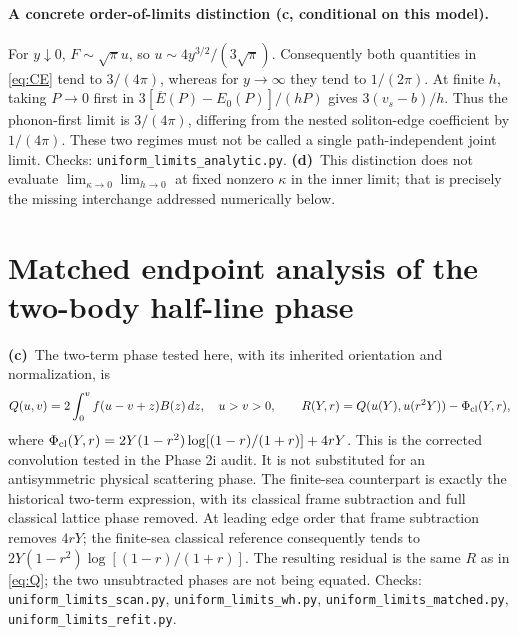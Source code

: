 \documentclass[11pt,a4paper]{article}
\newcommand{\C}{\textbf{(c)}\ }
\newcommand{\D}{\textbf{(d)}\ }
\newcommand{\scr}[1]{\texttt{uniform\_\allowbreak limits\_\allowbreak #1.py}}
\begin{document}
\paragraph{A concrete order-of-limits distinction (c, conditional on this model).}
For $y\downarrow0$, $F\sim\sqrt\pi u$, so $u\sim4y^{3/2}/(3\sqrt\pi)$.
Consequently both quantities in \eqref{eq:CE} tend to $3/(4\pi)$, whereas
for $y\to\infty$ they tend to $1/(2\pi)$. At finite $h$, taking $P\to0$
first in $3[\overline E(P)-E_0(P)]/(hP)$ gives $3(v_s-b)/h$.
Thus the phonon-first limit is $3/(4\pi)$, differing from the nested
soliton-edge coefficient by $1/(4\pi)$. These two regimes must not be
called a single path-independent joint limit. Checks: \scr{analytic}.
\D This distinction does not evaluate $\lim_{\kappa\to0}\lim_{h\to0}$
at fixed nonzero $\kappa$ in the inner limit; that is precisely the missing
interchange addressed numerically below.

\section{Matched endpoint analysis of the two-body half-line phase}
\C The two-term phase tested here, with its inherited orientation and
normalization, is
\begin{equation}
 Q(u,v)=2\int_0^v f(u-v+z)B(z)\,dz,\quad u>v>0,
 \qquad R(Y,r)=Q(u(Y),u(r^2Y))-\Phi_{\rm cl}(Y,r),\label{eq:Q}
\end{equation}
where
$\Phi_{\rm cl}(Y,r)=2Y(1-r^2)\log[(1-r)/(1+r)]+4rY$.
This is the corrected convolution tested in the Phase 2i audit.
It is not substituted for an antisymmetric physical scattering phase.
The finite-sea counterpart is exactly the historical two-term expression,
with its classical frame subtraction and full classical lattice phase removed.
At leading edge order that frame subtraction removes $4rY$; the finite-sea
classical reference consequently tends to $2Y(1-r^2)\log[(1-r)/(1+r)]$.
The resulting residual is the same $R$ as in \eqref{eq:Q}; the two
unsubtracted phases are not being equated.
Checks: \scr{scan}, \scr{wh}, \scr{matched}, \scr{refit}.
\end{document}
